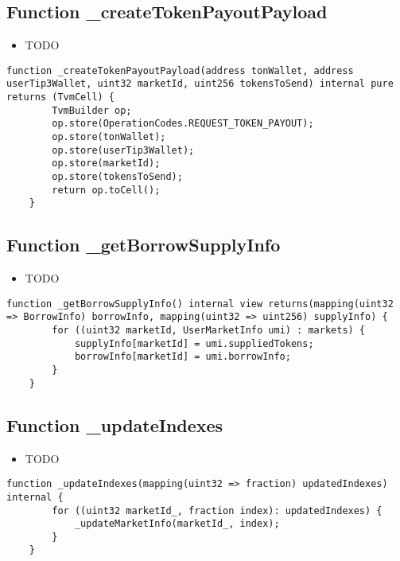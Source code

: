 \subsection{Function \_{}createTokenPayoutPayload}

\noindent\begin{itemize}
\item TODO
\end{itemize}

\begin{lstlisting}[firstnumber=363]
    function _createTokenPayoutPayload(address tonWallet, address userTip3Wallet, uint32 marketId, uint256 tokensToSend) internal pure returns (TvmCell) {
        TvmBuilder op;
        op.store(OperationCodes.REQUEST_TOKEN_PAYOUT);
        op.store(tonWallet);
        op.store(userTip3Wallet);
        op.store(marketId);
        op.store(tokensToSend);
        return op.toCell();
    }
\end{lstlisting}

\subsection{Function \_{}getBorrowSupplyInfo}

\noindent\begin{itemize}
\item TODO
\end{itemize}

\begin{lstlisting}[firstnumber=356]
    function _getBorrowSupplyInfo() internal view returns(mapping(uint32 => BorrowInfo) borrowInfo, mapping(uint32 => uint256) supplyInfo) {
        for ((uint32 marketId, UserMarketInfo umi) : markets) {
            supplyInfo[marketId] = umi.suppliedTokens;
            borrowInfo[marketId] = umi.borrowInfo;
        }
    }
\end{lstlisting}

\subsection{Function \_{}updateIndexes}

\noindent\begin{itemize}
\item TODO
\end{itemize}

\begin{lstlisting}[firstnumber=338]
    function _updateIndexes(mapping(uint32 => fraction) updatedIndexes) internal {
        for ((uint32 marketId_, fraction index): updatedIndexes) {
            _updateMarketInfo(marketId_, index);
        }
    }
\end{lstlisting}

